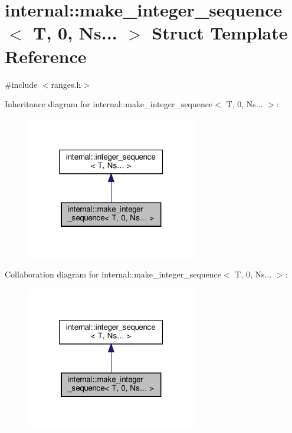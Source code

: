\hypertarget{structinternal_1_1make__integer__sequence_3_01_t_00_010_00_01_ns_8_8_8_01_4}{}\section{internal\+:\+:make\+\_\+integer\+\_\+sequence$<$ T, 0, Ns... $>$ Struct Template Reference}
\label{structinternal_1_1make__integer__sequence_3_01_t_00_010_00_01_ns_8_8_8_01_4}


{\ttfamily \#include $<$ranges.\+h$>$}



Inheritance diagram for internal\+:\+:make\+\_\+integer\+\_\+sequence$<$ T, 0, Ns... $>$\+:
\nopagebreak
\begin{figure}[H]
\begin{center}
\leavevmode
\includegraphics[width=211pt]{structinternal_1_1make__integer__sequence_3_01_t_00_010_00_01_ns_8_8_8_01_4__inherit__graph}
\end{center}
\end{figure}


Collaboration diagram for internal\+:\+:make\+\_\+integer\+\_\+sequence$<$ T, 0, Ns... $>$\+:
\nopagebreak
\begin{figure}[H]
\begin{center}
\leavevmode
\includegraphics[width=211pt]{structinternal_1_1make__integer__sequence_3_01_t_00_010_00_01_ns_8_8_8_01_4__coll__graph}
\end{center}
\end{figure}
